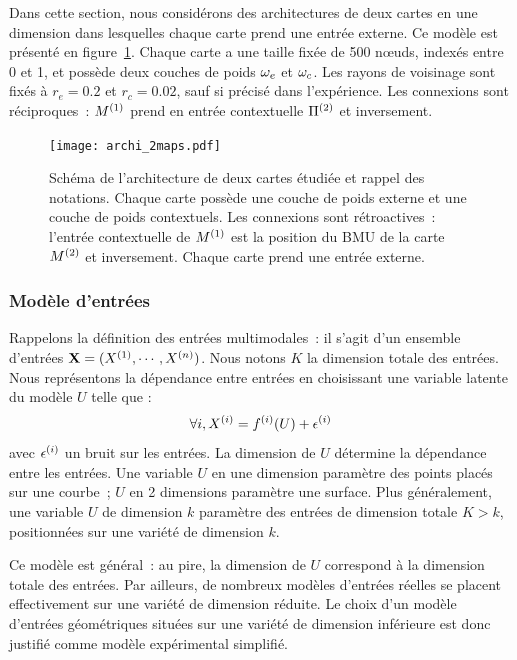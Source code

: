 \documentclass[../main]{subfiles}
\begin{document}
Dans cette section, nous considérons des architectures de deux cartes en une dimension dans lesquelles chaque carte prend une entrée externe. Ce modèle est présenté en figure~\ref{fig:archis}.
Chaque carte a une taille fixée de 500 n\oe{}uds, indexés entre 0 et 1, et possède deux couches de poids $\omega_e$ et $\omega_c$. Les rayons de voisinage sont fixés à $r_e = 0.2$ et $r_c = 0.02$, sauf si précisé dans l'expérience.
Les connexions sont réciproques~: $M^{({1})}$ prend en entrée contextuelle $\Pi^{({2})}$ et inversement.

\begin{figure}[t]
	\centering\texttt{[image: archi\_2maps.pdf]}
	\caption{Schéma de l'architecture de deux cartes étudiée et rappel des notations. Chaque carte possède une couche de poids externe et une couche de poids contextuels. Les connexions sont rétroactives~: l'entrée contextuelle de $M^{({1})}$ est la position du BMU de la carte $M^{({2})}$ et inversement. Chaque carte prend une entrée externe.\label{fig:archis}}
\end{figure}

\subsubsection{Modèle d'entrées}

Rappelons la définition des entrées multimodales~: il s'agit d'un ensemble d'entrées $\mathbf{X} = (X^{({1})}, \cdots, X^{({n})})$. Nous notons $K$ la dimension totale des entrées.
Nous représentons la dépendance entre entrées en choisissant une variable latente du modèle $U$ telle que :
$$ \forall i, X^{({i})} = f^{({i})}(U) + \epsilon^{({i})}$$
avec $\epsilon^{({i})}$ un bruit sur les entrées.
La dimension de $U$ détermine la dépendance entre les entrées.
Une variable $U$ en une dimension paramètre des points placés sur une courbe~; $U$ en 2 dimensions paramètre une surface. Plus généralement, une variable $U$ de dimension $k$ paramètre des entrées de dimension totale $K > k$, positionnées sur une variété de dimension $k$.

Ce modèle est général~: au pire, la dimension de $U$ correspond à la dimension totale des entrées. 
Par ailleurs, de nombreux modèles d'entrées réelles se placent effectivement sur une variété de dimension réduite. Le choix d'un modèle d'entrées géométriques situées sur une variété de dimension inférieure est donc justifié comme modèle expérimental simplifié.
\end{document}
